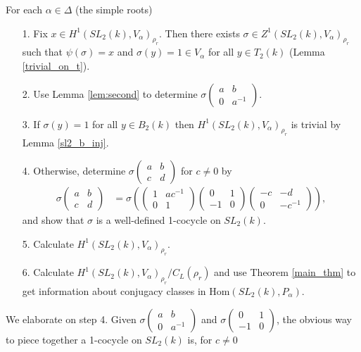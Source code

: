 For each $\alpha \in \Delta$ (the simple roots)
	\begin{itemize}
	\item[1.] Fix $x\in H^1(SL_2(k), V_\alpha)_{\rho_r}$. Then there exists $\sigma\in Z^1(SL_2(k), V_\alpha)_{\rho_r}$ such that $\psi(\sigma) = x$ and $\sigma\left(y\right) = 1 \in V_\alpha$ for all $y\in T_2(k)$ (Lemma \ref{trivial_on_t}).
	\item[2.] Use Lemma \ref{lem:second} to determine $\sigma\left(\begin{matrix}a & b\\0 & a^{-1}\end{matrix}\right)$. 
	\item[3.] If $\sigma\left(y\right) = 1$ for all $y\in B_2(k)$ then $H^1(SL_2(k), V_\alpha)_{\rho_r}$ is trivial by Lemma \ref{sl2_b_inj}.
	\item[4.] Otherwise, determine $\sigma\left(\begin{matrix}a & b\\c & d\end{matrix}\right)$ for $c \neq 0$ by
	\begin{align*}
	\sigma\left(\begin{matrix}a & b\\c & d\end{matrix}\right) &= \sigma\left(
			\left(\begin{matrix}1 & ac^{-1}\\0 & 1\end{matrix}\right)
			\left(\begin{matrix}0 & 1\\-1 & 0\end{matrix}\right)
			\left(\begin{matrix}-c & -d\\0 & -c^{-1}\end{matrix}\right)
			\right),
	\end{align*}
	and show that $\sigma$ is a well-defined 1-cocycle on $SL_2(k)$.
	\item[5.] Calculate $H^1(SL_2(k), V_\alpha)_{\rho_r}$.
	\item[6.] Calculate $H^1(SL_2(k), V_\alpha)_{\rho_r}/C_L(\rho_r)$ and use Theorem \ref{main_thm} to get information about conjugacy classes in $\mathrm{Hom}(SL_2(k), P_\alpha)$.
	\end{itemize}
We elaborate on step 4. Given $\sigma\left(\begin{matrix}a & b \\ 0 & a^{-1}\end{matrix}\right)$ and $\sigma\left(\begin{matrix}0 & 1\\-1 & 0\end{matrix}\right)$, the obvious way to piece together a 1-cocycle on $SL_2(k)$ is, for $c\neq 0$
